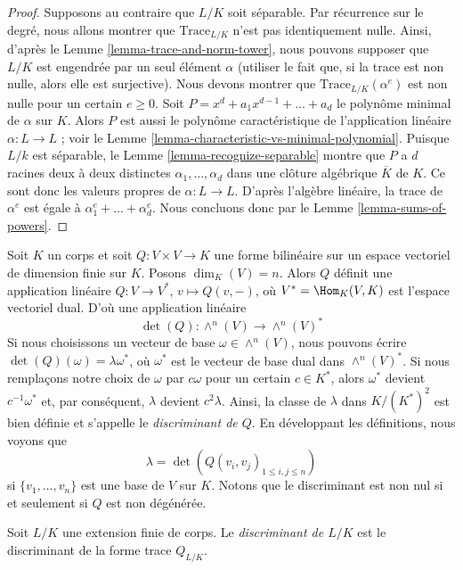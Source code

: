 \begin{proof}
\medskip\noindent
Supposons au contraire que $L/K$ soit séparable.
Par récurrence sur le degré, nous allons montrer que
$\text{Trace}_{L/K}$ n'est pas identiquement nulle.
Ainsi, d'après le Lemme \ref{lemma-trace-and-norm-tower}, nous pouvons supposer que
$L/K$ est engendrée par un seul élément $\alpha$ (utiliser le fait que, si
la trace est non nulle, alors elle est surjective).
Nous devons montrer que $\text{Trace}_{L/K}(\alpha^e)$
est non nulle pour un certain $e \geq 0$.
Soit $P = x^d + a_1 x^{d - 1} + \ldots + a_d$ le polynôme
minimal de $\alpha$ sur $K$.
Alors $P$ est aussi le polynôme caractéristique de l'application linéaire
$\alpha : L \to L$ ; voir le
Lemme \ref{lemma-characteristic-vs-minimal-polynomial}.
Puisque $L/k$ est séparable, le Lemme \ref{lemma-recognize-separable} montre
que $P$ a $d$ racines deux à deux distinctes $\alpha_1, \ldots, \alpha_d$
dans une clôture algébrique $\overline{K}$ de $K$. Ce sont donc les
valeurs propres de $\alpha : L \to L$.
D'après l'algèbre linéaire, la trace de $\alpha^e$ est
égale à $\alpha_1^e + \ldots + \alpha_d^e$.
Nous concluons donc par le Lemme \ref{lemma-sums-of-powers}.
\end{proof}

\noindent
Soit $K$ un corps et soit $Q : V \times V \to K$ une forme bilinéaire
sur un espace vectoriel de dimension finie sur $K$. Posons $\dim_K(V) = n$.
Alors $Q$ définit une application linéaire $Q : V \to V^*$, $v \mapsto Q(v, -)$,
où $V^* = \Hom_K(V, K)$ est l'espace vectoriel dual. D'où une application linéaire
$$
\det(Q) : \wedge^n(V) \longrightarrow \wedge^n(V)^*
$$
Si nous choisissons un vecteur de base $\omega \in \wedge^n(V)$, nous pouvons
écrire $\det(Q)(\omega) = \lambda \omega^*$, où $\omega^*$
est le vecteur de base dual dans $\wedge^n(V)^*$. Si nous remplaçons notre
choix de $\omega$ par $c \omega$ pour un certain $c \in K^*$, alors
$\omega^*$ devient $c^{-1} \omega^*$ et, par conséquent,
$\lambda$ devient $c^2 \lambda$. Ainsi, la classe de
$\lambda$ dans $K/(K^*)^2$ est bien définie et s'appelle le
{\it discriminant de $Q$}. En développant les définitions, nous voyons que
$$
\lambda = \det(Q(v_i, v_j)_{1 \leq i, j \leq n})
$$
si $\{v_1, \ldots, v_n\}$ est une base de $V$ sur $K$. Notons que
le discriminant est non nul si et seulement si $Q$ est non dégénérée.

\begin{definition}
\label{definition-discriminant}
Soit $L/K$ une extension finie de corps. Le
{\it discriminant de $L/K$} est le discriminant de
la forme trace $Q_{L/K}$.
\end{definition}

